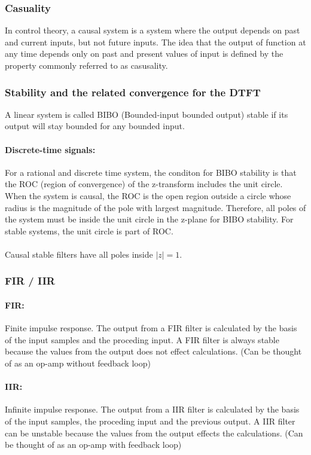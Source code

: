 \documentclass{article}
\begin{document}
\subsubsection{Casuality}
In control theory, a causal system is a system where the output depends on past and current inputs, but not future inputs. The idea that the output of function at any time depends only on past and present values of input is defined by the property commonly referred to as casusality. 

\subsubsection{Stability and the related convergence for the DTFT}
A linear system is called BIBO (Bounded-input bounded output) stable if its output will stay bounded for any bounded input. 

\paragraph{Discrete-time signals:} For a rational and discrete time system, the conditon for BIBO stability  is that the ROC (region of convergence) of the z-transform includes the unit circle. When the system is causal, the ROC is the open region outside a circle whose radius is the magnitude of the pole with largest magnitude. Therefore, all poles of the system must be inside the unit circle in the z-plane for BIBO stability. For stable systems, the unit circle is part of ROC. 
\\
\\
Causal stable filters have all poles inside $|z| = 1$.

\subsubsection{FIR / IIR}
\paragraph{FIR:} Finite impulse response. The output from a FIR filter is calculated by the basis of the input samples and the proceding input. A FIR filter is always stable because the values from the output does not effect calculations. 
(Can be thought of as an op-amp without feedback loop)


\paragraph{IIR:} Infinite impulse response. The output from a IIR filter is calculated by the basis of the input samples, the proceding input and the previous output. A IIR filter can be unstable because the values from the output effects the calculations. 
(Can be thought of as an op-amp with feedback loop)
\end{document}
